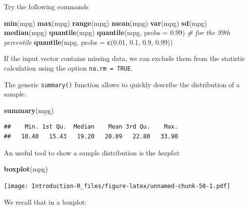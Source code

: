 \documentclass[]{book}
\newenvironment{Shaded}{\begin{snugshade}}{\end{snugshade}}
\newcommand{\CommentTok}[1]{\textcolor[rgb]{0.56,0.35,0.01}{\textit{#1}}}
\newcommand{\DataTypeTok}[1]{\textcolor[rgb]{0.13,0.29,0.53}{#1}}
\newcommand{\FloatTok}[1]{\textcolor[rgb]{0.00,0.00,0.81}{#1}}
\newcommand{\KeywordTok}[1]{\textcolor[rgb]{0.13,0.29,0.53}{\textbf{#1}}}
\newcommand{\NormalTok}[1]{#1}
\begin{document}
Try the following commands

\begin{Shaded}
\begin{Highlighting}[]
\KeywordTok{min}\NormalTok{(mpg)}
\KeywordTok{max}\NormalTok{(mpg)}
\KeywordTok{range}\NormalTok{(mpg)}
\KeywordTok{mean}\NormalTok{(mpg)}
\KeywordTok{var}\NormalTok{(mpg)}
\KeywordTok{sd}\NormalTok{(mpg)}
\KeywordTok{median}\NormalTok{(mpg)}
\KeywordTok{quantile}\NormalTok{(mpg)}
\KeywordTok{quantile}\NormalTok{(mpg, }\DataTypeTok{probs =} \FloatTok{0.99}\NormalTok{) }\CommentTok{# for the 99th percentile}
\KeywordTok{quantile}\NormalTok{(mpg, }\DataTypeTok{probs =} \KeywordTok{c}\NormalTok{(}\FloatTok{0.01}\NormalTok{, }\FloatTok{0.1}\NormalTok{, }\FloatTok{0.9}\NormalTok{, }\FloatTok{0.99}\NormalTok{))}
\end{Highlighting}
\end{Shaded}

If the input vector contains missing data, we can exclude them from the statistic calculation using the option \texttt{na.rm\ =\ TRUE}.

The generic \texttt{summary()} function allows to quickly describe the distribution of a sample:

\begin{Shaded}
\begin{Highlighting}[]
\KeywordTok{summary}\NormalTok{(mpg)}
\end{Highlighting}
\end{Shaded}

\begin{verbatim}
##    Min. 1st Qu.  Median    Mean 3rd Qu.    Max. 
##   10.40   15.43   19.20   20.09   22.80   33.90
\end{verbatim}

An useful tool to show a sample distribution is the \emph{boxplot}:

\begin{Shaded}
\begin{Highlighting}[]
\KeywordTok{boxplot}\NormalTok{(mpg)}
\end{Highlighting}
\end{Shaded}

\texttt{[image: Introduction-R\_files/figure-latex/unnamed-chunk-50-1.pdf]}

We recall that in a boxplot:
\end{document}
